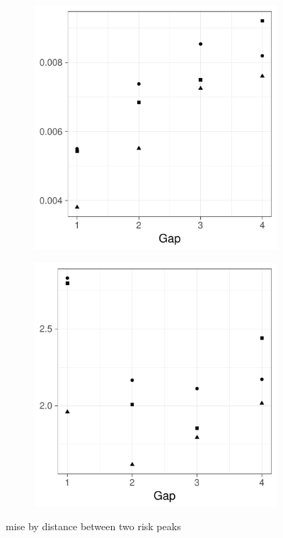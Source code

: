 \begin{figure}[htbp]
    \begin{subfigure}[b]{0.49\textwidth}
        \includegraphics[width=\textwidth]{results/by_two_peaks/RMISE-vs-risk-peak-gap}
        \caption{}
    \end{subfigure}
    \begin{subfigure}[b]{0.49\textwidth}
        \includegraphics[width=\textwidth]{results/by_two_peaks/NMISE-vs-risk-peak-gap}
        \caption{}
    \end{subfigure}
    \caption{\gls{mise} by distance between two risk peaks}
    \label{fig:ise:p1.4_100_G}
\end{figure}

